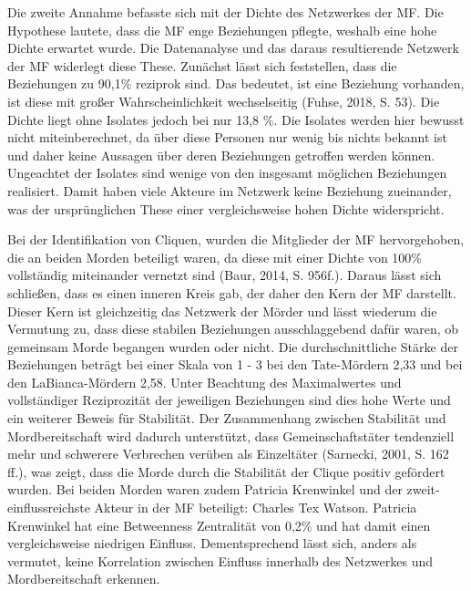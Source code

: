 \documentclass[
]{article}
\begin{document}
Die zweite Annahme befasste sich mit der Dichte des Netzwerkes der MF.
Die Hypothese lautete, dass die MF enge Beziehungen pflegte, weshalb
eine hohe Dichte erwartet wurde. Die Datenanalyse und das daraus
resultierende Netzwerk der MF widerlegt diese These. Zunächst lässt sich
feststellen, dass die Beziehungen zu 90,1\% reziprok sind. Das bedeutet,
ist eine Beziehung vorhanden, ist diese mit großer Wahrscheinlichkeit
wechselseitig (Fuhse, 2018, S. 53). Die Dichte liegt ohne Isolates
jedoch bei nur 13,8 \%. Die Isolates werden hier bewusst nicht
miteinberechnet, da über diese Personen nur wenig bis nichts bekannt ist
und daher keine Aussagen über deren Beziehungen getroffen werden können.
Ungeachtet der Isolates sind wenige von den insgesamt möglichen
Beziehungen realisiert. Damit haben viele Akteure im Netzwerk keine
Beziehung zueinander, was der ursprünglichen These einer vergleichsweise
hohen Dichte widerspricht.

Bei der Identifikation von Cliquen, wurden die Mitglieder der MF
hervorgehoben, die an beiden Morden beteiligt waren, da diese mit einer
Dichte von 100\% vollständig miteinander vernetzt sind (Baur, 2014, S.
956f.). Daraus lässt sich schließen, dass es einen inneren Kreis gab,
der daher den Kern der MF darstellt. Dieser Kern ist gleichzeitig das
Netzwerk der Mörder und lässt wiederum die Vermutung zu, dass diese
stabilen Beziehungen ausschlaggebend dafür waren, ob gemeinsam Morde
begangen wurden oder nicht. Die durchschnittliche Stärke der Beziehungen
beträgt bei einer Skala von 1 - 3 bei den Tate-Mördern 2,33 und bei den
LaBianca-Mördern 2,58. Unter Beachtung des Maximalwertes und
vollständiger Reziprozität der jeweiligen Beziehungen sind dies hohe
Werte und ein weiterer Beweis für Stabilität. Der Zusammenhang zwischen
Stabilität und Mordbereitschaft wird dadurch unterstützt, dass
Gemeinschaftstäter tendenziell mehr und schwerere Verbrechen verüben als
Einzeltäter (Sarnecki, 2001, S. 162 ff.), was zeigt, dass die Morde
durch die Stabilität der Clique positiv gefördert wurden. Bei beiden
Morden waren zudem Patricia Krenwinkel und der zweit-einflussreichste
Akteur in der MF beteiligt: Charles Tex Watson. Patricia Krenwinkel hat
eine Betweenness Zentralität von 0,2\% und hat damit einen
vergleichsweise niedrigen Einfluss. Dementsprechend lässt sich, anders
als vermutet, keine Korrelation zwischen Einfluss innerhalb des
Netzwerkes und Mordbereitschaft erkennen.
\end{document}
